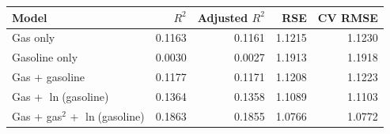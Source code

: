 \begin{tabular}{lrrrr}
\toprule
Model & $R^2$ & Adjusted $R^2$ & RSE & CV RMSE \\
\midrule
Gas only & 0.1163 & 0.1161 & 1.1215 & 1.1230 \\
Gasoline only & 0.0030 & 0.0027 & 1.1913 & 1.1918 \\
Gas + gasoline & 0.1177 & 0.1171 & 1.1208 & 1.1223 \\
Gas + $\ln$(gasoline) & 0.1364 & 0.1358 & 1.1089 & 1.1103 \\
Gas + gas$^2$ + $\ln$(gasoline) & 0.1863 & 0.1855 & 1.0766 & 1.0772 \\
\bottomrule
\end{tabular}
